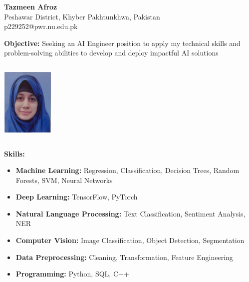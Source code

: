 \documentclass[a4paper,10pt]{article}
\begin{document}
\begin{multicols}{2}

\begin{column}{\textwidth}
    {\LARGE \textbf{Tazmeen Afroz}}\\ %
    Peshawar District, Khyber Pakhtunkhwa, Pakistan\\
   p229252@pwr.nu.edu.pk 

    \vspace{5pt}
\textbf{Objective:} Seeking an AI Engineer position to apply my technical skills and problem-solving abilities to develop and deploy impactful AI solutions

\end{column}

\begin{column}{\textwidth}
    \hfill
    \includegraphics[width=2.5cm,height=3.2cm]{image.jpg}
\end{column}

\end{multicols}

\vspace{10pt}


{\Large \textbf{Skills:}}
\begin{itemize}
    \item \textbf{Machine Learning:} Regression, Classification, Decision Trees, Random Forests, SVM, Neural Networks
    \item \textbf{Deep Learning:} TensorFlow, PyTorch
    \item \textbf{Natural Language Processing:} Text Classification, Sentiment Analysis, NER
    \item \textbf{Computer Vision:} Image Classification, Object Detection, Segmentation
    \item \textbf{Data Preprocessing:} Cleaning, Transformation, Feature Engineering
    \item \textbf{Programming:} Python, SQL, C++
\end{itemize}
\end{document}
